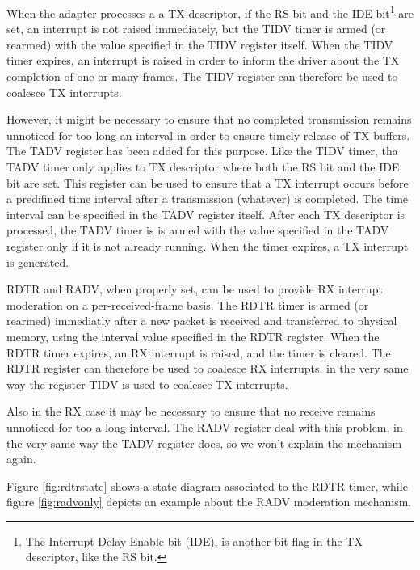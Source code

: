 When the adapter processes a a TX descriptor, if the RS bit and the IDE bit\footnote{The Interrupt Delay Enable bit (IDE), is another
bit flag in the TX descriptor, like the RS bit.} are set, an interrupt is not raised immediately, but the TIDV timer is armed (or
rearmed) with the value specified in the TIDV register itself. When the TIDV timer expires, an interrupt is raised in order
to inform the driver about the TX completion of one or many frames.
The TIDV register can therefore be used to coalesce TX interrupts.

However, it might be necessary to ensure that no completed transmission remains unnoticed for too long an interval in order to 
ensure timely release of TX buffers.
The TADV register has been added for this purpose. Like the TIDV timer, tha TADV timer only applies to TX descriptor where both the
RS bit and the IDE bit are set. This register can be used to ensure that a TX interrupt occurs before a predifined time interval
after a transmission (whatever) is completed. The time interval can be specified in the TADV register itself.
After each TX descriptor is processed, the TADV timer is is armed with the value specified in the TADV 
register only if it is not already running.
When the timer expires, a TX interrupt is generated.

\vspace{0.5cm}

RDTR and RADV, when properly set, can be used to provide RX interrupt moderation on a per-received-frame basis.
The RDTR timer is armed (or rearmed) immediatly after a new packet is received and transferred to physical memory, using
the interval value specified in the RDTR register. When the RDTR timer expires, an RX interrupt is raised, and the timer is cleared.
The RDTR register can therefore be used to coalesce RX interrupts, in the very same way the register TIDV is used to coalesce TX
interrupts.

Also in the RX case it may be necessary to ensure that no receive remains unnoticed for too a long interval. The RADV register deal
with this problem, in the very same way the TADV register does, so we won't explain the mechanism again.

\vspace{0.5cm}

Figure \ref{fig:rdtrstate} shows a state diagram associated to the RDTR timer, while figure \ref{fig:radvonly} depicts an example
about the RADV moderation mechanism.

